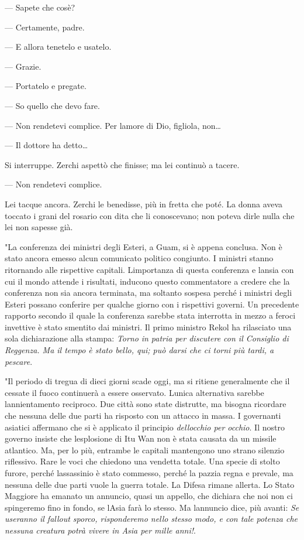 --- Sapete che cos\textquotesingle è?

--- Certamente, padre.

--- E allora tenetelo e usatelo.

--- Grazie.

--- Portatelo e pregate.

--- So quello che devo fare.

--- Non rendetevi complice. Per l\textquotesingle amore di Dio,
figliola, non\ldots{}

--- Il dottore ha detto\ldots{}

Si interruppe. Zerchi aspettò che finisse; ma lei continuò a tacere.

--- Non rendetevi complice.

Lei tacque ancora. Zerchi le benedisse, più in fretta che poté. La donna
aveva toccato i grani del rosario con dita che li conoscevano; non
poteva dirle nulla che lei non sapesse già.

"La conferenza dei ministri degli Esteri, a Guam, si è appena conclusa.
Non è stato ancora emesso alcun comunicato politico congiunto. I
ministri stanno ritornando alle rispettive capitali.
L\textquotesingle importanza di questa conferenza e
l\textquotesingle ansia con cui il mondo attende i risultati, inducono
questo commentatore a credere che la conferenza non sia ancora
terminata, ma soltanto sospesa perché i ministri degli Esteri possano
conferire per qualche giorno con i rispettivi governi. Un precedente
rapporto secondo il quale la conferenza sarebbe stata interrotta in
mezzo a feroci invettive è stato smentito dai ministri. Il primo
ministro Rekol ha rilasciato una sola dichiarazione alla stampa:
\emph{Torno} \emph{in patria per discutere con il Consiglio di Reggenza.
	Ma il tempo è stato bello, qui; può darsi che ci torni più tardi, a
	pescare}.

"Il periodo di tregua di dieci giorni scade oggi, ma si ritiene
generalmente che il cessate il fuoco continuerà a essere osservato.
L\textquotesingle unica alternativa sarebbe
l\textquotesingle annientamento reciproco. Due città sono state
distrutte, ma bisogna ricordare che nessuna delle due parti ha risposto
con un attacco in massa. I governanti asiatici affermano che si è
applicato il principio \emph{dell\textquotesingle occhio per occhio}. Il
nostro governo insiste che l\textquotesingle esplosione di Itu Wan non è
stata causata da un missile atlantico. Ma, per lo più, entrambe le
capitali mantengono uno strano silenzio riflessivo. Rare le voci che
chiedono una vendetta totale. Una specie di stolto furore, perché
l\textquotesingle assassinio è stato commesso, perché la pazzia regna e
prevale, ma nessuna delle due parti vuole la guerra totale. La Difesa
rimane all\textquotesingle erta. Lo Stato Maggiore ha emanato un
annuncio, quasi un appello, che dichiara che noi non ci spingeremo fino
in fondo, se l\textquotesingle Asia farà lo stesso. Ma
l\textquotesingle annuncio dice, più avanti: \emph{Se useranno il
	fallout sporco, risponderemo nello stesso modo, e con tale potenza che
	nessuna creatura potrà vivere in Asia per mille anni!}.

